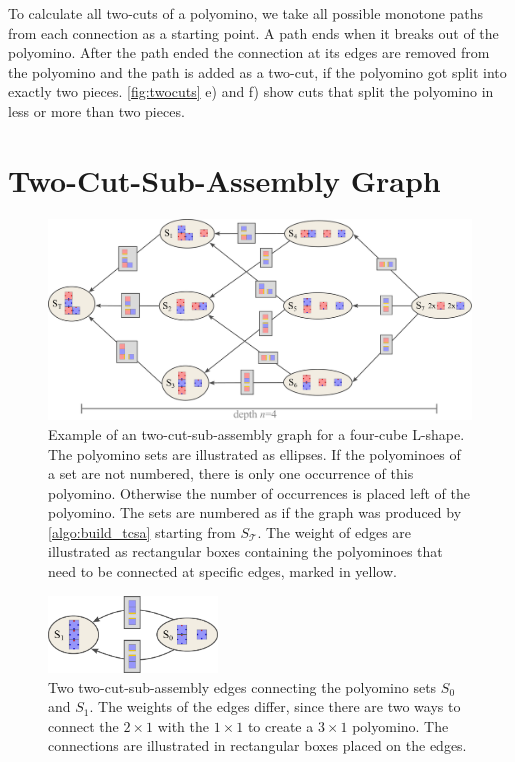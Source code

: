 To calculate all two-cuts of a polyomino, we take all possible monotone paths from each connection as a starting point.
A path ends when it breaks out of the polyomino.
After the path ended the connection at its edges are removed from the polyomino and the path is added as a two-cut, if the polyomino got split into exactly two pieces.
\autoref{fig:twocuts} e) and f) show cuts that split the polyomino in less or more than two pieces.


\section{Two-Cut-Sub-Assembly Graph}
\label{sec:tcsa}

\begin{figure}
	\centering
	\includegraphics[width=1\textwidth]{figures/tcsa.pdf}
	\caption[Example for a two-cut-sub-assembly graph.]{Example of an two-cut-sub-assembly graph for a four-cube L-shape. The polyomino sets are illustrated as ellipses. If the polyominoes of a set are not numbered, there is only one occurrence of this polyomino. Otherwise the number of occurrences is placed left of the polyomino. The sets are numbered as if the graph was produced by \autoref{algo:build_tcsa} starting from $S_\mathcal{T}$. The weight of edges are illustrated as rectangular boxes containing the polyominoes that need to be connected at specific edges, marked in yellow.}
	\label{fig:tcsa}
\end{figure}

\begin{figure}
	\centering
	\includegraphics[width=0.4\textwidth]{figures/tcsa_multiedge.pdf}
	\caption[Two two-cut-sub-assembly nodes connected with multiple edges.]{Two two-cut-sub-assembly edges connecting the polyomino sets $S_0$ and $S_1$. The weights of the edges differ, since there are two ways to connect the $2\times1$ with the $1\times1$ to create a $3\times1$ polyomino. The connections are illustrated in rectangular boxes placed on the edges.}
	\label{fig:tcsa_multiedge}
\end{figure}

